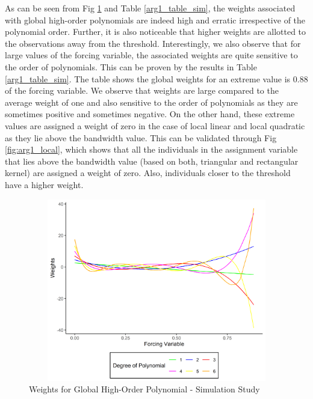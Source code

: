 \documentclass[fleqn]{article}
\begin{document}
    As can be seen from Fig \ref{fig:arg1} and Table \ref{arg1_table_sim}, the weights associated with global high-order polynomials are indeed high and erratic irrespective of the polynomial order. Further, it is also noticeable that higher weights are allotted to the observations away from the threshold. Interestingly, we also observe that for large values of the forcing variable, the associated weights are quite sensitive to the order of polynomials. This can be proven by the results in Table \ref{arg1_table_sim}. The table shows the global weights for an extreme value is $0.88$ of the forcing variable. We observe that weights are large compared to the average weight of one and also sensitive to the order of polynomials as they are sometimes positive and sometimes negative. On the other hand, these extreme values are assigned a weight of zero in the case of local linear and local quadratic as they lie above the bandwidth value. This can be validated through Fig \ref{fig:arg1_local}, which shows that all the individuals in the assignment variable that lies above the bandwidth value (based on both, triangular and rectangular kernel) are assigned a weight of zero. Also, individuals closer to the threshold have a higher weight.\\

    \begin{figure}[h]
        \centering
        \includegraphics[width = 15cm,height = 8cm]{arg1_sim.png}
        \caption{Weights for Global High-Order Polynomial - Simulation Study}
        \label{fig:arg1}
    \end{figure}
    
\end{document}
